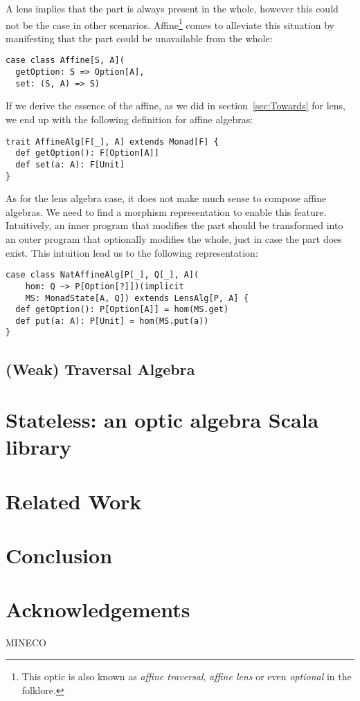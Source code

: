 \documentclass[final, twocolumn, 3p]{elsarticle}
\begin{document}
A lens implies that the part is always present in the whole, however this could
not be the case in other scenarios. Affine\footnote{This optic is also known as
\emph{affine traversal}, \emph{affine lens} or even \emph{optional} in the
folklore.} comes to alleviate this situation by manifesting that the part could
be unavailable from the whole:

\begin{lstlisting}
case class Affine[S, A](
  getOption: S => Option[A],
  set: (S, A) => S)
\end{lstlisting}

If we derive the essence of the affine, as we did in section~\ref{sec:Towards}
for lens, we end up with the following definition for affine algebras:

\begin{lstlisting}
trait AffineAlg[F[_], A] extends Monad[F] {
  def getOption(): F[Option[A]]
  def set(a: A): F[Unit]
}
\end{lstlisting}

As for the lens algebra case, it does not make much sense to compose affine
algebras. We need to find a morphism representation to enable this feature.
Intuitively, an inner program that modifies the part should be transformed into
an outer program that optionally modifies the whole, just in case the part does
exist. This intuition lead us to the following representation:

\begin{lstlisting}
case class NatAffineAlg[P[_], Q[_], A](
    hom: Q ~> P[Option[?]])(implicit
    MS: MonadState[A, Q]) extends LensAlg[P, A] {
  def getOption(): P[Option[A]] = hom(MS.get)
  def put(a: A): P[Unit] = hom(MS.put(a))
}
\end{lstlisting}

\subsection{(Weak) Traversal Algebra}


\section{Stateless: an optic algebra Scala library}
\label{sec:Stateless}



\section{Related Work}
\label{sec:Discussion}

\section{Conclusion}



\section*{Acknowledgements}
MINECO

{}

\end{document}
